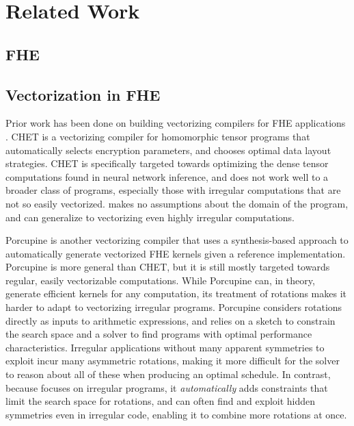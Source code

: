 \section{Related Work}\label{sec:related-work}
\subsection{FHE}
\subsection{Vectorization in FHE}
Prior work has been done on building vectorizing compilers for FHE applications \cite{CHET, Porcupine}.
CHET \cite{CHET} is a vectorizing compiler for homomorphic tensor programs that automatically selects encryption parameters, and chooses optimal data layout strategies.
CHET is specifically targeted towards optimizing the dense tensor computations found in neural network inference, and does not work well to a broader class of programs, especially those with irregular computations that are not so easily vectorized.
\system makes no assumptions about the domain of the program, and can generalize to vectorizing even highly irregular computations.

Porcupine \cite{Porcupine} is another vectorizing compiler that uses a synthesis-based approach to automatically generate vectorized FHE kernels given a reference implementation.
Porcupine is more general than CHET, but it is still mostly targeted towards regular, easily vectorizable computations.
While Porcupine can, in theory, generate efficient kernels for any computation, its treatment of rotations makes it harder to adapt to vectorizing irregular programs.
Porcupine considers rotations directly as inputs to arithmetic expressions, and relies on a sketch to constrain the search space and a solver to find programs with optimal performance characteristics.
Irregular applications without many apparent symmetries to exploit incur many asymmetric  rotations, making it more difficult for the solver to reason about all of these when producing an optimal schedule.
In contrast, because \system focuses on irregular programs, it {\em automatically} adds constraints that limit the search space for rotations, and can often find and exploit hidden symmetries even in irregular code, enabling it to combine more rotations at once.

